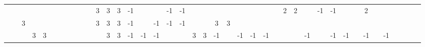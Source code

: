 \begin{table}[H]
{\begin{tabular}{ccccccccccccccccccccccccccccccccccccccccc}
   &    &                           &                           &                           &                           &                           &                           &                           &                           &                           & \cellcolor[HTML]{3531FF}3 & \cellcolor[HTML]{3531FF}3 & \cellcolor[HTML]{3531FF}3 & -1                        &                           &                           & -1                        & -1                        &                           &                           &                           &                           &    &    &    &                           & \cellcolor[HTML]{FE0000}2 & \cellcolor[HTML]{FE0000}2 &                           & -1                        & -1                        &                           &                           & \cellcolor[HTML]{FE0000}2 &                           &                           &                           &  &  &  \\
   &    & \cellcolor[HTML]{3531FF}3 &                           &                           &                           &                           &                           &                           &                           &                           & \cellcolor[HTML]{3531FF}3 & \cellcolor[HTML]{3531FF}3 & \cellcolor[HTML]{3531FF}3 & -1                        &                           & -1                        & -1                        & -1                        &                           &                           & \cellcolor[HTML]{3531FF}3 & \cellcolor[HTML]{3531FF}3 &    &    &    &                           &                           &                           &                           &                           &                           &                           &                           &                           &                           &                           &                           &  &  &  \\
   &    &                           & \cellcolor[HTML]{3531FF}3 & \cellcolor[HTML]{3531FF}3 &                           &                           &                           &                           &                           &                           &                           & \cellcolor[HTML]{3531FF}3 & \cellcolor[HTML]{3531FF}3 & -1                        & -1                        & -1                        &                           &                           & \cellcolor[HTML]{3531FF}3 & \cellcolor[HTML]{3531FF}3 & -1                        &                           & -1 & -1 & -1 &                           &                           &                           & -1                        &                           & -1                        & -1                        &                           & -1                        &                           & -1                        &                           &  &  &  \\

\end{tabular}}
\end{table}
